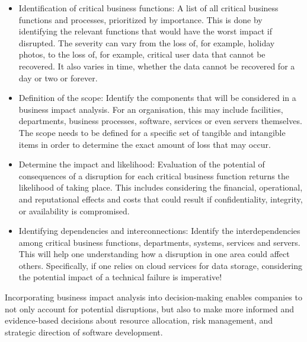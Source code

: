 \begin{itemize}
    \item Identification of critical business functions: A list of all critical business functions and processes, prioritized by importance. This is done by identifying the relevant functions that would have the worst impact if disrupted. The severity can vary from the loss of, for example, holiday photos, to the loss of, for example, critical user data that cannot be recovered. It also varies in time, whether the data cannot be recovered for a day or two or forever. 
    \item Definition of the scope: Identify the components that will be considered in a business impact analysis. For an organisation, this may include facilities, departments, business processes, software, services or even servers themselves. The scope needs to be defined for a specific set of tangible and intangible items in order to determine the exact amount of loss that may occur.
    \item Determine the impact and likelihood: Evaluation of the potential of consequences of a disruption for each critical business function returns the likelihood of taking place. This includes considering the financial, operational, and reputational effects and costs that could result if confidentiality, integrity, or availability is compromised.
    \item  Identifying dependencies and interconnections: Identify the interdependencies among critical business functions, departments, systems, services and servers. This will help one understanding how a disruption in one area could affect others. Specifically, if one relies on cloud services for data storage, considering the potential impact of a technical failure is imperative!
\end{itemize}

\noindent Incorporating business impact analysis into decision-making  enables companies to not only account for potential disruptions, but also to make more informed and evidence-based decisions about resource allocation, risk management, and strategic direction of software development. \cite{weippl_introduction_2024}

